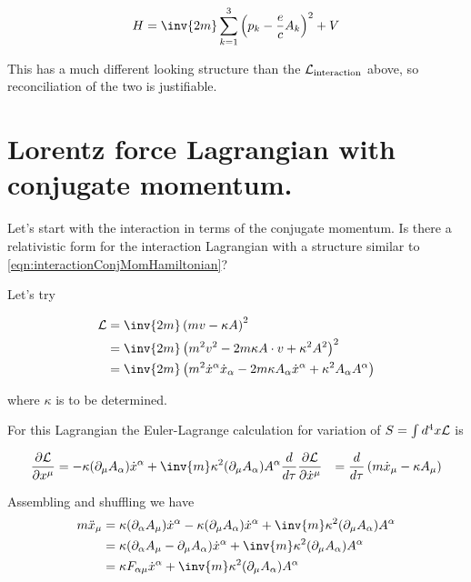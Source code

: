 \documentclass{article}
\begin{document}
\begin{align}\label{eqn:interactionConjMomHamiltonian}
H = \inv{2m}\sum_{k=1}^3 \left(p_k - \frac{e}{c} A_k \right)^2 + V
\end{align}

This has a much different looking structure than the $\mathcal{L}_{\text{interaction}}$ above, so reconciliation of the two
is justifiable.

\section{ Lorentz force Lagrangian with conjugate momentum. }

Let's start with the interaction in terms of the conjugate momentum.  Is there a relativistic form for the interaction
Lagrangian with a structure similar to \ref{eqn:interactionConjMomHamiltonian}?

Let's try

\begin{align*}
\LL
&= \inv{2 m}\left( m v - \kappa A \right)^2 \\
&= \inv{2 m}\left( m^2 v^2 - 2 m \kappa A \cdot v + \kappa^2 A^2 \right)^2 \\
&= \inv{2 m} \left( 
m^2 \xdot^\alpha \xdot_\alpha 
- 2 m \kappa A_\alpha \xdot^\alpha 
+ \kappa^2 A_\alpha A^\alpha 
\right) \\
\end{align*}

where $\kappa$ is to be determined.

For this Lagrangian the Euler-Lagrange calculation for variation of $S = \int d^4 x \mathcal{L}$ is

\begin{align*}
\PD{x^\mu}{\LL}
&= - \kappa (\partial_\mu A_\alpha) \xdot^\alpha + \inv{m} \kappa^2 (\partial_\mu A_\alpha) A^\alpha
\frac{d}{d\tau} \PD{\xdot^\mu}{\LL}
&= \frac{d}{d\tau} \left(m \xdot_\mu - \kappa A_\mu \right)
\end{align*}

Assembling and shuffling we have
\begin{align*}
m \xddot_\mu 
&= \kappa (\partial_\alpha A_\mu) \xdot^\alpha
- \kappa (\partial_\mu A_\alpha) \xdot^\alpha + \inv{m} \kappa^2 (\partial_\mu A_\alpha) A^\alpha \\
&= \kappa (\partial_\alpha A_\mu - \partial_\mu A_\alpha) \xdot^\alpha + \inv{m} \kappa^2 (\partial_\mu A_\alpha) A^\alpha \\
&= \kappa F_{\alpha\mu} \xdot^\alpha + \inv{m} \kappa^2 (\partial_\mu A_\alpha) A^\alpha \\
\end{align*}
\end{document}
